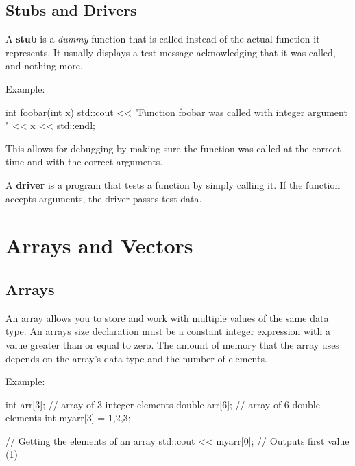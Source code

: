 \documentclass{report}
\begin{document}
    \pagebreak \bigbreak \noindent 
    \subsection{Stubs and Drivers}
    \bigbreak \noindent 
    \begin{concept}
 A \textbf{stub} is a \textit{dummy} function that is called instead of the actual function it represents. It usually displays a test message acknowledging that it was called, and nothing more.
	\end{concept}
    \bigbreak \noindent 
    Example:
    \bigbreak \noindent 
    
    \begin{cppcode}
int foobar(int x) {
    std::cout << "Function foobar was called with integer argument " 
    << x 
    << std::endl;
}
    \end{cppcode}
    
    \bigbreak \noindent 
    This allows for debugging by making sure the function was called at the correct time and with the correct arguments.
    \bigbreak \noindent 
    \begin{concept}
 A \textbf{driver} is a program that tests a function by simply calling it. If the function accepts arguments, the driver passes test data.
	\end{concept}

    \pagebreak \bigbreak \noindent 
    \section{\LARGE Arrays and Vectors}
    \bigbreak \noindent 
    \subsection{Arrays}
    \bigbreak \noindent 
    \begin{concept}
 An array allows you to store and work with multiple values of the same data type. An arrays size declaration must be a constant integer expression with a value greater than or equal to zero. The amount of memory that the array uses depends on the array's data type and the number of elements.
	\end{concept}
    \bigbreak \noindent 
    Example:
    \bigbreak \noindent 
    
    \begin{cppcode}
int arr[3]; // array of 3 integer elements
double arr[6]; // array of 6 double elements
int myarr[3] = {1,2,3};

// Getting the elements of an array
std::cout << myarr[0]; // Outputs first value (1)
    \end{cppcode}
    
\end{document}
